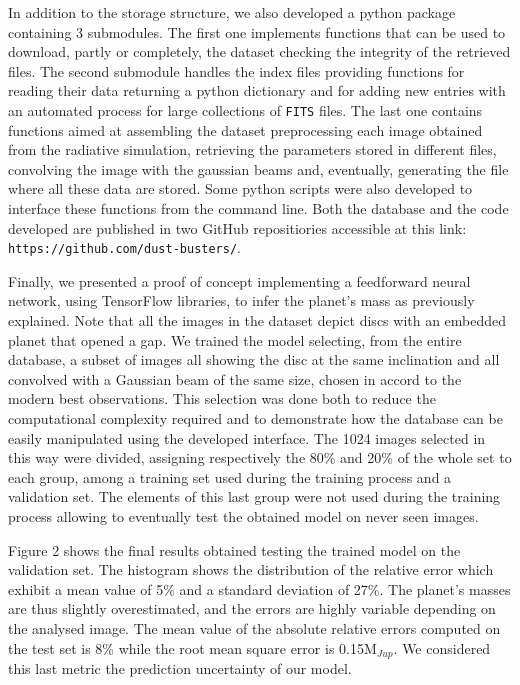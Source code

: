 \documentclass[a4paper,10pt, margin=1cm]{article}
\begin{document}
In addition to the storage structure, we also developed a python package containing 3 submodules. 
The first one implements functions that can be used to download, partly or completely, the dataset
checking the integrity of the retrieved files.
The second submodule handles the index files providing functions for reading their data
returning a python dictionary and for adding new entries 
with an automated process for large collections of \lstinline{FITS} files.
The last one contains functions aimed at assembling the dataset 
preprocessing each image obtained 
from the radiative simulation, retrieving the parameters stored in different files,
convolving the image with the gaussian beams and, eventually, generating the file where all these data are stored.
Some python scripts were also developed to interface these functions from the command line.
Both the database and the code developed are published in two GitHub repositiories accessible at this link: \lstinline{https://github.com/dust-busters/}.

Finally, we presented a proof of concept implementing a feedforward
neural network, using TensorFlow libraries, to infer the planet's mass as previously explained.
Note that all the images in the dataset depict discs with an embedded planet that opened a gap.
We trained the model selecting, from the entire database,
a subset of images all showing the disc at the same inclination and all convolved with a Gaussian beam of the same size,
chosen in accord to the modern best observations. This selection was done both to reduce the
computational complexity required and to demonstrate how the database can be easily manipulated using the
developed interface. The 1024 images selected in this way were divided, assigning respectively the 80\% and 20\% of the whole set to each group,
among a training set used during the training process
and a validation set. The elements of this last group were not used during the training process allowing to eventually test the obtained model 
on never seen images. 

Figure 2 shows the final results obtained testing the trained model on the validation set. The histogram shows the
distribution of the relative error which exhibit a mean value of 5\% and a standard deviation of 27\%.
The planet's masses are thus slightly overestimated, and the errors are highly variable depending on the analysed image.
The mean value of the absolute relative errors computed on the test set is 8\% while the root mean square error is
0.15M$_{Jup}$. We considered this last metric the prediction uncertainty of our model.
\end{document}
